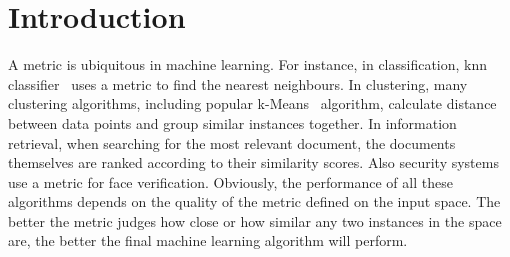 \documentclass[12pt,a4paper]{report}
\begin{document}



\tableofcontents







\chapter{Introduction} \label{chap:intro}



A metric is ubiquitous in machine learning. For instance, in classification, \ac{knn} classifier~\citep{cover1967nearest} uses a metric to find the nearest neighbours. In clustering, many clustering algorithms, including popular k-Means~\citep{hartigan1979algorithm} algorithm, calculate distance between data points and group similar instances together. In information retrieval, when searching for the most relevant document, the documents themselves are ranked according to their similarity scores. Also security systems use a metric for face verification. Obviously, the performance of all these algorithms depends on the quality of the metric defined on the input space. The better the metric judges how close or how similar any two instances in the space are, the better the final machine learning algorithm will perform.
\end{document}
